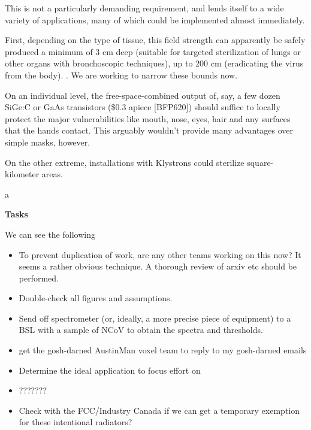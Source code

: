 \documentclass[fleqn,10pt]{paper}
\begin{document}
This is not a particularly demanding requirement, and lends itself to a wide variety of applications, many of which could be implemented almost immediately.

First, depending on the type of tissue, this field strength can apparently be safely produced a minimum of 3 cm deep (suitable for targeted sterilization of lungs or other organs with bronchoscopic techniques), up to 200 cm (eradicating the virus from the body). . We are working to narrow these bounds now.

On an individual level, the free-space-combined output of, say, a few dozen SiGe:C or GaAs transistors (\$0.3 apiece [BFP620]) should suffice to locally protect the major vulnerabilities like mouth, nose, eyes, hair and any surfaces that the hands contact. This arguably wouldn't provide many advantages over simple masks, however.

On the other extreme, installations with Klystrons could sterilize square-kilometer areas.


\begin{autem}
	a
\end{autem}


{\Large \textbf{Tasks}}

We can see the following 

\begin{itemize}
	\item To prevent duplication of work, are any other teams working on this now? It seems a rather obvious technique. A thorough review of arxiv etc should be performed.
	\item Double-check all figures and assumptions.
	\item Send off spectrometer (or, ideally, a more precise piece of equipment) to a BSL with a sample of NCoV to obtain the spectra and thresholds.
	\item get the gosh-darned AustinMan voxel team to reply to my gosh-darned emails
	\item Determine the ideal application to focus effort on
	\item ???????
	\item Check with the FCC/Industry Canada if we can get a temporary exemption for these intentional radiators?
	
\end{itemize}


\clearpage




\printbibliography[heading=none, title={}]
\end{document}
